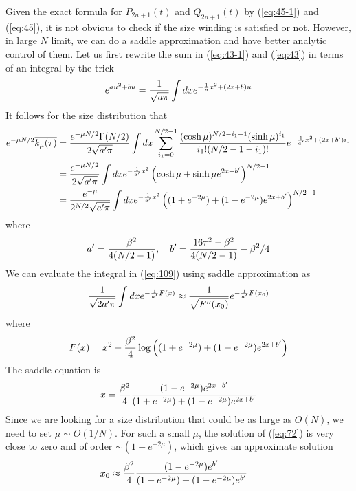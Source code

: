 \documentclass[11pt]{article}
\renewcommand{\>}{\rangle}
\newcommand{\<}{\langle}
\begin{document}
Given the exact formula for $\overline{P_{2n+1}(t)}$ and $\overline{Q_{2n+1}(t)}$
by (\ref{eq:45-1}) and (\ref{eq:45}), it is not obvious to check
if the size winding is satisfied or not. However, in large $N$ limit,
we can do a saddle approximation and have better analytic control
of them. Let us first rewrite the sum in (\ref{eq:43-1}) and (\ref{eq:43})
in terms of an integral by the trick
\begin{equation}
e^{au^{2}+bu}=\frac{1}{\sqrt{a\pi}}\int dxe^{-\frac{1}{a}x^{2}+(2x+b)u}\label{eq:trick}
\end{equation}
It follows for the size distribution that 
\begin{align}
e^{-\mu N/2}\overline{k_{\mu}(\tau)} & =\frac{e^{-\mu N/2}\Gamma(N/2)}{2\sqrt{a'\pi}}\int dx\sum_{i_{1}=0}^{N/2-1}\frac{(\cosh\mu)^{N/2-i_{1}-1}(\sinh\mu)^{i_{1}}}{i_{1}!(N/2-1-i_{1})!}e^{-\frac{1}{a'}x^{2}+(2x+b')i_{1}}\nonumber \\
 & =\frac{e^{-\mu N/2}}{2\sqrt{a'\pi}}\int dxe^{-\frac{1}{a'}x^{2}}\left(\cosh\mu+\sinh\mu e^{2x+b'}\right)^{N/2-1}\nonumber \\
 & =\frac{e^{-\mu}}{2^{N/2}\sqrt{a'\pi}}\int dxe^{-\frac{1}{a'}x^{2}}\left((1+e^{-2\mu})+(1-e^{-2\mu})e^{2x+b'}\right)^{N/2-1}\label{eq:109}
\end{align}
where 
\begin{equation}
a'=\frac{\beta^{2}}{4(N/2-1)},\quad b'=\frac{16\tau^{2}-\beta^{2}}{4(N/2-1)}-\beta^{2}/4
\end{equation}
We can evaluate the integral in (\ref{eq:109}) using saddle approximation
as 
\begin{equation}
\frac{1}{\sqrt{2a'\pi}}\int dxe^{-\frac{1}{a'}F(x)}\approx\frac{1}{\sqrt{F''(x_{0})}}e^{-\frac{1}{a'}F(x_{0})}\label{eq:70-1}
\end{equation}
where 
\begin{equation}
F(x)=x^{2}-\frac{\beta^{2}}{4}\log\left((1+e^{-2\mu})+(1-e^{-2\mu})e^{2x+b'}\right)\label{eq:68}
\end{equation}
The saddle equation is 
\begin{equation}
x=\frac{\beta^{2}}{4}\frac{(1-e^{-2\mu})e^{2x+b'}}{(1+e^{-2\mu})+(1-e^{-2\mu})e^{2x+b'}}\label{eq:72}
\end{equation}
Since we are looking for a size distribution that could be as large
as $O(N)$, we need to set $\mu\sim O(1/N)$. For such a small $\mu$,
the solution of (\ref{eq:72}) is very close to zero and of order
$\sim(1-e^{-2\mu})$, which gives an approximate solution 
\begin{align}
x_{0} & \approx\frac{\beta^{2}}{4}\frac{(1-e^{-2\mu})e^{b'}}{(1+e^{-2\mu})+(1-e^{-2\mu})e^{b'}}\label{eq:x0}
\end{align}
\end{document}
